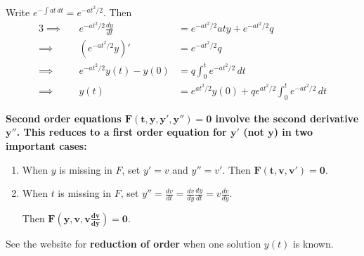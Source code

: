 \documentclass[a4paper]{article}
\begin{document}

Write \(e^{-\int at \, dt} = e^{-at^{2}/2}\). Then
\begin{alignat*}{3}
	\implies && e^{-at^{2}/2} \frac{d y}{d t}  & = e^{-at^{2}/2} aty + e^{-at^{2}/2} q  \\
	\implies && \!\left( e^{-at^{2}/2} y \right)'  & = e^{-at^{2}/2}q \\ 
	\implies && e^{-at^{2}/2} y \!\left( t \right) - y \!\left( 0 \right)  & = q\int^{t}_{0} e^{-at^{2}/2}  \, dt  \\
	\implies && y \!\left( t \right) & = e^{at^{2}/2} y \!\left( 0 \right) + q e^{at^{2}/2} \int^{t}_{0} e^{-at^{2}/2} \, dt  
\end{alignat*}

\textbf{Second order equations \(\bm{F \!\left( t,y,y',y'' \right) = 0}\) involve the second derivative \(\bm{y''}\). This reduces to a first order equation for \(\bm{y'}\) (not \(\bm{y}\)) in two important cases:}

\begin{enumerate}[label=\Roman*.]
	\item When \(y\) is missing in \(F\), set \(y' = v\) and \(y'' = v'\). Then \(\bm{F \!\left( t, v, v' \right) = 0}\).
	\item When \(t\) is missing in \(F\), set \(\displaystyle{y'' = \frac{d v}{d t} = \frac{d v}{d y} \frac{d y}{d t} = v \frac{d v}{d y} }\). 

	Then \(\bm{F \!\left( y, v, v \frac{d v}{d y}  \right) = 0}\).
\end{enumerate}

See the website for \textbf{reduction of order} when one solution \(y \!\left( t \right) \) is known. 

\end{document}

